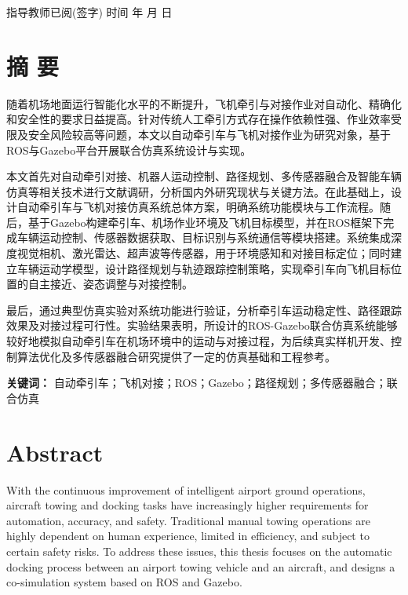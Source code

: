 \documentclass[UTF8,a4paper,12pt]{ctexart}
\begin{document}
指导教师已阅(签字) 时间 年 月 日

\clearpage
\tableofcontents
\clearpage

\section*{摘 要}\label{_Toc229105287}

随着机场地面运行智能化水平的不断提升，飞机牵引与对接作业对自动化、精确化和安全性的要求日益提高。针对传统人工牵引方式存在操作依赖性强、作业效率受限及安全风险较高等问题，本文以自动牵引车与飞机对接作业为研究对象，基于ROS与Gazebo平台开展联合仿真系统设计与实现。

本文首先对自动牵引对接、机器人运动控制、路径规划、多传感器融合及智能车辆仿真等相关技术进行文献调研，分析国内外研究现状与关键方法。在此基础上，设计自动牵引车与飞机对接仿真系统总体方案，明确系统功能模块与工作流程。随后，基于Gazebo构建牵引车、机场作业环境及飞机目标模型，并在ROS框架下完成车辆运动控制、传感器数据获取、目标识别与系统通信等模块搭建。系统集成深度视觉相机、激光雷达、超声波等传感器，用于环境感知和对接目标定位；同时建立车辆运动学模型，设计路径规划与轨迹跟踪控制策略，实现牵引车向飞机目标位置的自主接近、姿态调整与对接控制。

最后，通过典型仿真实验对系统功能进行验证，分析牵引车运动稳定性、路径跟踪效果及对接过程可行性。实验结果表明，所设计的ROS-Gazebo联合仿真系统能够较好地模拟自动牵引车在机场环境中的运动与对接过程，为后续真实样机开发、控制算法优化及多传感器融合研究提供了一定的仿真基础和工程参考。

\textbf{关键词：} 自动牵引车；飞机对接；ROS；Gazebo；路径规划；多传感器融合；联合仿真

\section*{Abstract}

With the continuous improvement of intelligent airport ground operations, aircraft towing and docking tasks have increasingly higher requirements for automation, accuracy, and safety. Traditional manual towing operations are highly dependent on human experience, limited in efficiency, and subject to certain safety risks. To address these issues, this thesis focuses on the automatic docking process between an airport towing vehicle and an aircraft, and designs a co-simulation system based on ROS and Gazebo.
\end{document}
